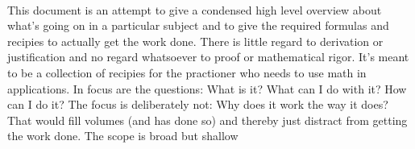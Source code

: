 \paragraph{}
This document is an attempt to give a condensed high level overview about what's going on in a particular subject and to give the required formulas and recipies to actually get the work done. There is little regard to derivation or justification and no regard whatsoever to proof or mathematical rigor. It's meant to be a collection of recipies for the practioner who needs to use math in applications. In focus are the questions: What is it? What can I do with it? How can I do it? The focus is deliberately not: Why does it work the way it does? That would fill volumes (and has done so) and thereby just distract from getting the work done. The scope is broad but shallow

